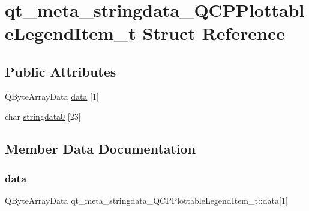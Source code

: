 \hypertarget{structqt__meta__stringdata___q_c_p_plottable_legend_item__t}{}\section{qt\+\_\+meta\+\_\+stringdata\+\_\+\+Q\+C\+P\+Plottable\+Legend\+Item\+\_\+t Struct Reference}
\label{structqt__meta__stringdata___q_c_p_plottable_legend_item__t}
\subsection*{Public Attributes}
\begin{DoxyCompactItemize}
\item 
Q\+Byte\+Array\+Data \mbox{\hyperlink{structqt__meta__stringdata___q_c_p_plottable_legend_item__t_a56d928faacdea012d9b501b879ef98a8}{data}} \mbox{[}1\mbox{]}
\item 
char \mbox{\hyperlink{structqt__meta__stringdata___q_c_p_plottable_legend_item__t_a2add548f134b64b363d6ee1b2125da1d}{stringdata0}} \mbox{[}23\mbox{]}
\end{DoxyCompactItemize}


\subsection{Member Data Documentation}
\mbox{\label{structqt__meta__stringdata___q_c_p_plottable_legend_item__t_a56d928faacdea012d9b501b879ef98a8}} 
\subsubsection{\texorpdfstring{data}{data}}
{\footnotesize\ttfamily Q\+Byte\+Array\+Data qt\+\_\+meta\+\_\+stringdata\+\_\+\+Q\+C\+P\+Plottable\+Legend\+Item\+\_\+t\+::data\mbox{[}1\mbox{]}}

\mbox{\label{structqt__meta__stringdata___q_c_p_plottable_legend_item__t_a2add548f134b64b363d6ee1b2125da1d}} 
